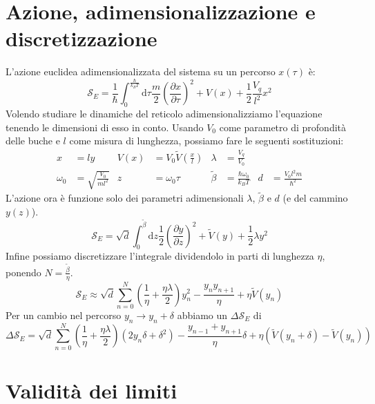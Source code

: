 \documentclass[italian]{article}
\newcommand{\action}{\mathcal{S}}
\newcommand{\deriv}[2]{\frac{\partial #1}{\partial #2}}
\newcommand{\diff}{\mathrm{d}}
\begin{document}
\section{Azione, adimensionalizzazione e discretizzazione} 

    L'azione euclidea adimensionalizzata del sistema su un percorso $x(\tau)$ è:
    \begin{equation}
        \action_E = \frac{1}{\hbar} \int_0^{\frac{\hbar}{k_B T}} \diff\tau \frac{m}{2}\left(\deriv{x}{\tau}\right)^2 + V(x) + \frac{1}{2} \frac{V_q}{l^2} x^2
    \end{equation}
    Volendo studiare le dinamiche del reticolo adimensionalizziamo l'equazione tenendo le dimensioni di esso in conto. Usando $V_0$ come parametro di profondità delle buche e $l$ come misura di lunghezza, possiamo fare le seguenti sostituzioni:
    \begin{align*}
        x &= ly  & V(x)&=V_0 \tilde{V}\left(\frac{x}{l}\right) & \lambda &= \frac{V_q}{V_0} \\
        \omega_0 &= \sqrt{\frac{V_0}{m l^2}} & z &= \omega_0 \tau & \tilde{\beta} &= \frac{\hbar \omega_0}{k_B T} & d &
        = \frac{V_0 l^2 m}{\hbar^2}
    \end{align*}
    L'azione ora è funzione solo dei parametri adimensionali $\lambda$, $\tilde{\beta}$ e $d$ (e del cammino $y(z)$).
    \begin{equation}
        \action_E = \sqrt{d} \int_0^{\tilde{\beta}} \diff z \frac{1}{2} \left(\deriv{y}{z}\right)^2 + \tilde{V}\left(y\right) + \frac{1}{2} \lambda y^2
    \end{equation}
    Infine possiamo discretizzare l'integrale dividendolo in parti di lunghezza $\eta$, ponendo $N = \frac{\tilde{\beta}}{\eta}$.
    \begin{equation}
        \action_E \approx \sqrt{d} \sum_{n=0}^N \left(\frac{1}{\eta} + \frac{\eta \lambda}{2}\right) y_n^2 - \frac{y_n y_{n+1}}{\eta} + \eta \tilde{V} \left(y_n\right) 
    \end{equation}
    Per un cambio nel percorso $y_n \to y_n + \delta$ abbiamo un $\Delta\action_E$ di
    \begin{equation}
        \Delta\action_E = \sqrt{d} \sum_{n=0}^N \left(\frac{1}{\eta} + \frac{\eta \lambda}{2}\right) (2y_n\delta + \delta^2) - \frac{y_{n-1} + y_{n+1}}{\eta}\delta + \eta \left( \tilde{V} \left(y_n + \delta\right) - \tilde{V} \left(y_n\right) \right)
    \end{equation}
    
\section{Validità dei limiti}
\end{document}
